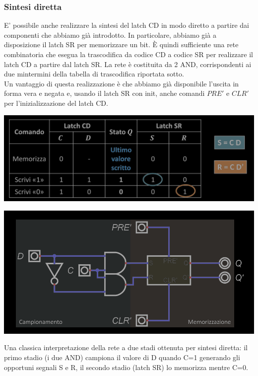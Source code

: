 \documentclass{article}
\begin{document}
\subsubsection{Sintesi diretta}
E’ possibile anche realizzare la sintesi del latch CD in modo diretto a partire dai componenti che abbiamo già introdotto. In particolare, abbiamo già a disposizione il latch SR per memorizzare un bit. È quindi sufficiente una rete combinatoria che esegua la trascodifica da codice CD a codice SR per realizzare il latch CD a partire dal latch SR. La rete è costituita da 2 AND, corrispondenti ai due mintermini della tabella di trascodifica riportata sotto.\\
Un vantaggio di questa realizzazione è che abbiamo già disponibile l’uscita in forma vera e negata e, usando il latch SR con init, anche comandi $PRE'$ e $CLR'$ per l’inizializzazione del latch CD.
\begin{center}
    \includegraphics[scale=0.35]{latchCD-sintesi-diretta.png}
\end{center}
\begin{center}
    \includegraphics[scale=0.35]{latchCD-rete.png}
\end{center}
Una classica interpretazione della rete a due stadi ottenuta per sintesi diretta: il primo stadio (i due AND) campiona il valore di D quando C=1 generando gli opportuni segnali S e R, il secondo stadio (latch SR) lo memorizza mentre C=0.
\end{document}
